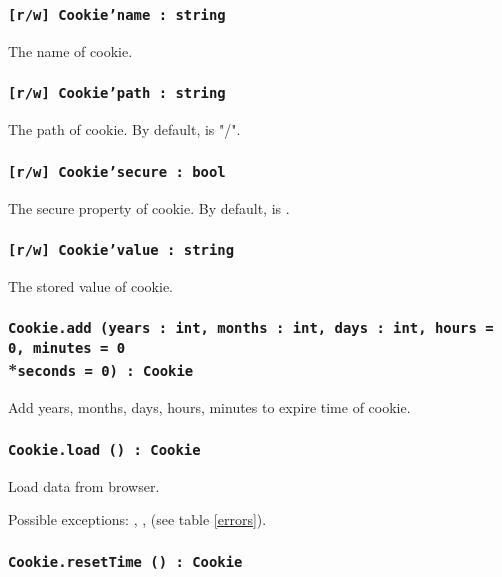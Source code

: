 \subsubsection{\texttt{[r/w] Cookie'name : string}}

The name of cookie.

\subsubsection{\texttt{[r/w] Cookie'path : string}}

The path of cookie. By default, is "/".

\subsubsection{\texttt{[r/w] Cookie'secure : bool}}

The secure property of cookie. By default, is \false.

\subsubsection{\texttt{[r/w] Cookie'value : string}}

The stored value of cookie.

\subsubsection{\texttt{Cookie.add (years : int, months : int, days : int, hours = 0, minutes = 0}\\*\noindent\texttt{seconds = 0) : Cookie}}

Add years, months, days, hours, minutes to expire time of cookie.

\subsubsection{\texttt{Cookie.load () : Cookie}}

Load \cookie{} data from browser.

Possible exceptions: , ,  (see table \ref{errors}).

\subsubsection{\texttt{Cookie.resetTime () : Cookie}}

